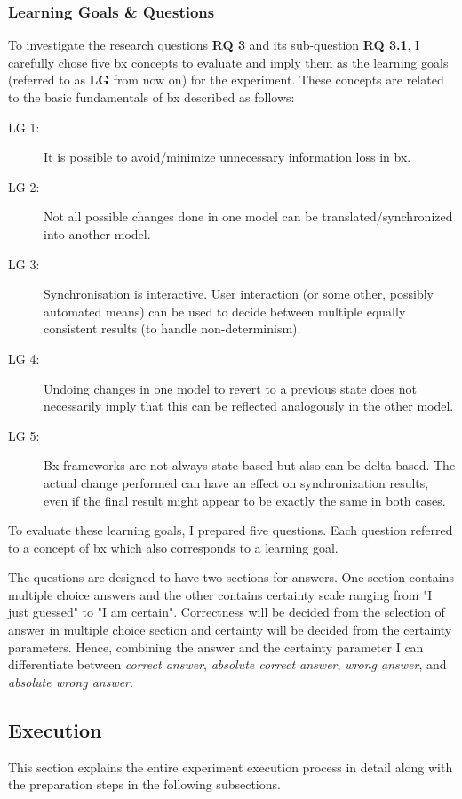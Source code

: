 \subsubsection{Learning Goals \& Questions}\label{subsubsec:questions}
To investigate the research questions \textbf{RQ 3} and its sub-question \textbf{RQ 3.1}, I carefully chose five bx concepts to evaluate and imply them as the learning goals (referred to as \textbf{LG} from now on) for the experiment. These concepts are related to the basic fundamentals of bx described as follows:
\begin{description}
	\item[LG 1:] It is possible to avoid/minimize unnecessary information loss in bx. 
	\item[LG 2:] Not all possible changes done in one model can be translated/synchronized into another model.
	\item[LG 3:] Synchronisation is interactive. User interaction (or some other, possibly automated means) can be used to decide between multiple equally consistent results (to handle non-determinism). 
	\item[LG 4:] Undoing changes in one model to revert to a previous state does not necessarily imply that this can be reflected analogously in the other model. 
	\item[LG 5:] Bx frameworks are not always state based but also can be delta based. The actual change performed can have an effect on synchronization results, even if the final result might appear to be exactly the same in both cases. 
\end{description}

To evaluate these learning goals, I prepared five questions. Each question referred to a concept of bx which also corresponds to a learning goal.

The questions are designed to have two sections for answers. One section contains multiple choice answers and the other contains certainty scale ranging from "I just guessed" to "I am certain". Correctness will be decided from the selection of answer in multiple choice section and certainty will be decided from the certainty parameters. Hence, combining the answer and the certainty parameter I can differentiate between \emph{correct answer}, \emph{absolute correct answer}, \emph{wrong answer}, and \emph{absolute wrong answer}.

\subsection{Execution}\label{subsec:execution} 
This section explains the entire experiment execution process in detail along with the preparation steps in the following subsections.

